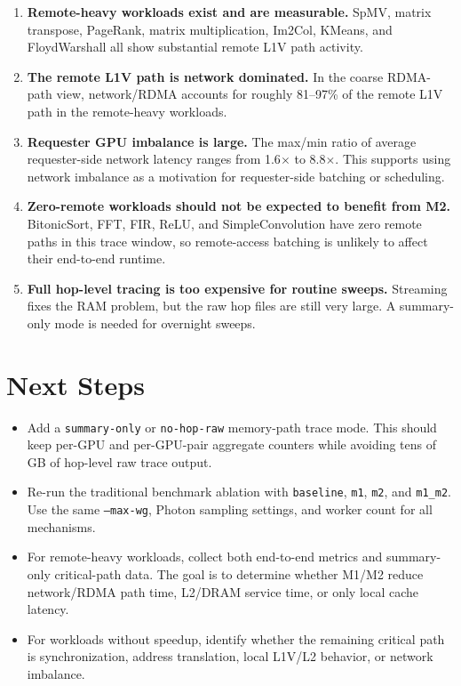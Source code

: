\documentclass[sigconf,screen,review]{acmart}
\begin{document}
\begin{enumerate}
  \item \textbf{Remote-heavy workloads exist and are measurable.}  SpMV,
  matrix transpose, PageRank, matrix multiplication, Im2Col, KMeans, and
  FloydWarshall all show substantial remote L1V path activity.

  \item \textbf{The remote L1V path is network dominated.}  In the coarse
  RDMA-path view, network/RDMA accounts for roughly 81--97\% of the remote
  L1V path in the remote-heavy workloads.

  \item \textbf{Requester GPU imbalance is large.}  The max/min ratio of
  average requester-side network latency ranges from 1.6$\times$ to
  8.8$\times$.  This supports using network imbalance as a motivation for
  requester-side batching or scheduling.

  \item \textbf{Zero-remote workloads should not be expected to benefit from
  M2.}  BitonicSort, FFT, FIR, ReLU, and SimpleConvolution have zero remote
  paths in this trace window, so remote-access batching is unlikely to affect
  their end-to-end runtime.

  \item \textbf{Full hop-level tracing is too expensive for routine sweeps.}
  Streaming fixes the RAM problem, but the raw hop files are still very large.
  A summary-only mode is needed for overnight sweeps.
\end{enumerate}

\section{Next Steps}

\begin{itemize}
  \item Add a \texttt{summary-only} or \texttt{no-hop-raw} memory-path trace
  mode.  This should keep per-GPU and per-GPU-pair aggregate counters while
  avoiding tens of GB of hop-level raw trace output.

  \item Re-run the traditional benchmark ablation with
  \texttt{baseline}, \texttt{m1}, \texttt{m2}, and \texttt{m1\_m2}.  Use the
  same \texttt{--max-wg}, Photon sampling settings, and worker count for all
  mechanisms.

  \item For remote-heavy workloads, collect both end-to-end metrics and
  summary-only critical-path data.  The goal is to determine whether M1/M2
  reduce network/RDMA path time, L2/DRAM service time, or only local cache
  latency.

  \item For workloads without speedup, identify whether the remaining critical
  path is synchronization, address translation, local L1V/L2 behavior, or
  network imbalance.
\end{itemize}
\end{document}
